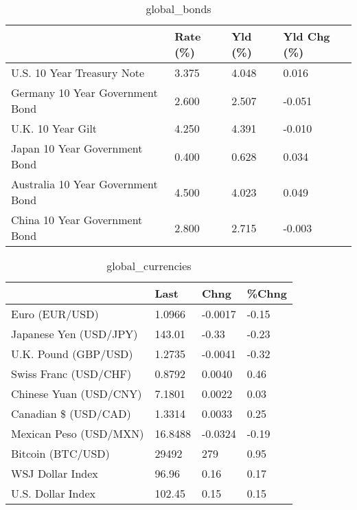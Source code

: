 \documentclass{article}%
\begin{document}
%


\begin{table}[htbp]%
\caption{global\_bonds}%
\centering%
\begin{adjustbox}{width=1\textwidth}%
\begin{tabular}{llll}
\toprule
                                  & Rate (\%) & Yld (\%) & Yld Chg (\%) \\
\midrule
       U.S. 10 Year Treasury Note &    3.375 &   4.048 &       0.016 \\
  Germany 10 Year Government Bond &    2.600 &   2.507 &      -0.051 \\
                U.K. 10 Year Gilt &    4.250 &   4.391 &      -0.010 \\
    Japan 10 Year Government Bond &    0.400 &   0.628 &       0.034 \\
Australia 10 Year Government Bond &    4.500 &   4.023 &       0.049 \\
    China 10 Year Government Bond &    2.800 &   2.715 &      -0.003 \\
\bottomrule
\end{tabular}
%
\end{adjustbox}%
\end{table}

%


\begin{table}[htbp]%
\caption{global\_currencies}%
\centering%
\begin{adjustbox}{width=1\textwidth}%
\begin{tabular}{llll}
\toprule
                       &    Last &    Chng & \%Chng \\
\midrule
        Euro (EUR/USD) &  1.0966 & -0.0017 & -0.15 \\
Japanese Yen (USD/JPY) &  143.01 &   -0.33 & -0.23 \\
  U.K. Pound (GBP/USD) &  1.2735 & -0.0041 & -0.32 \\
 Swiss Franc (USD/CHF) &  0.8792 &  0.0040 &  0.46 \\
Chinese Yuan (USD/CNY) &  7.1801 &  0.0022 &  0.03 \\
  Canadian \$ (USD/CAD) &  1.3314 &  0.0033 &  0.25 \\
Mexican Peso (USD/MXN) & 16.8488 & -0.0324 & -0.19 \\
     Bitcoin (BTC/USD) &   29492 &     279 &  0.95 \\
      WSJ Dollar Index &   96.96 &    0.16 &  0.17 \\
     U.S. Dollar Index &  102.45 &    0.15 &  0.15 \\
\bottomrule
\end{tabular}
%
\end{adjustbox}%
\end{table}
\end{document}
